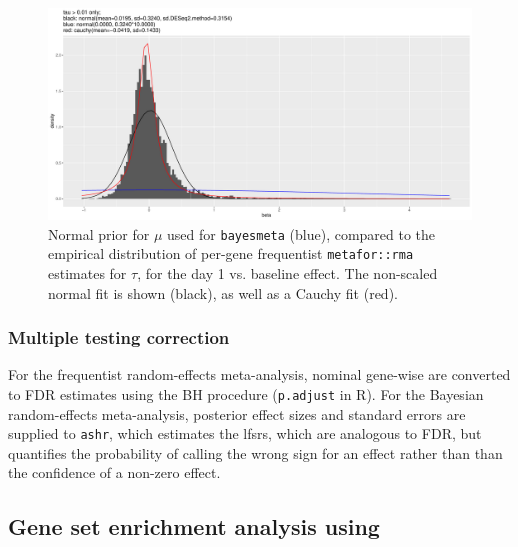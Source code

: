 \begin{figure}
    \includegraphics[width=1.0\textwidth,page=1]{mainmatter/figures/chapter_02/meta.bayesmeta.priors.coefName_d1.vs.d0.pdf}
    \caption{Normal prior for $\mu$ used for \texttt{bayesmeta} (blue), compared to the empirical distribution of per-gene frequentist \texttt{metafor::rma} estimates for $\tau$, for the day 1 vs. baseline effect. The non-scaled normal fit is shown (black), as well as a Cauchy fit (red).}
    \label{fig:hird_dgeMeta_priors_mu}
\end{figure}

\subsubsection{Multiple testing correction}

For the frequentist random-effects meta-analysis, nominal gene-wise \pvalues{} are converted to \gls{FDR} estimates using the \gls{BH} procedure (\texttt{p.adjust} in R).
For the Bayesian random-effects meta-analysis, posterior effect sizes and standard errors are supplied to \texttt{ashr}, which estimates the \glspl{lfsr}, which are analogous to \gls{FDR}, but quantifies the probability of calling the wrong sign for an effect rather than than the confidence of a non-zero effect\autocite{stephens2016FalseDiscoveryRates}.
%

\subsection{Gene set enrichment analysis using }


